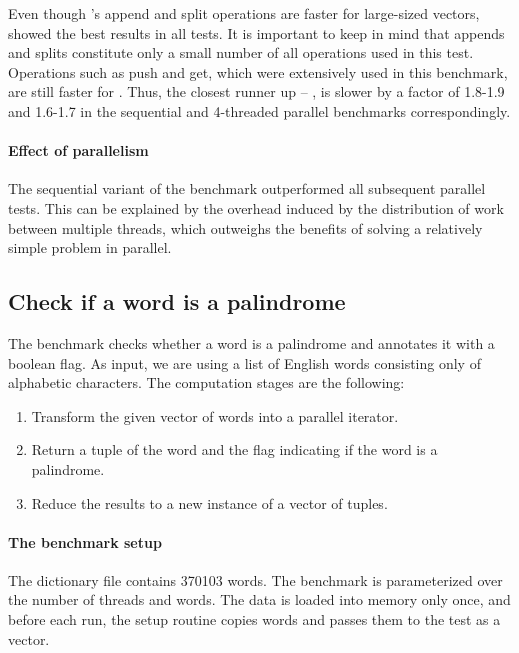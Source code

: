 Even though \rrbvec{}'s append and split operations are faster for large-sized vectors, \stdvec{} showed the best results in all tests. It is important to keep in mind that appends and splits constitute only a small number of all operations used in this test. Operations such as push and get, which were extensively used in this benchmark, are still faster for \stdvec{}. Thus, the closest runner up -- \pvec{}, is slower by a factor of 1.8-1.9 and 1.6-1.7 in the sequential and 4-threaded parallel benchmarks correspondingly.

\paragraph{Effect of parallelism}
The sequential variant of the benchmark outperformed all subsequent parallel tests. This can be explained by the overhead induced by the distribution of work between multiple threads, which outweighs the benefits of solving a relatively simple problem in parallel.

\subsection{Check if a word is a palindrome}
The benchmark checks whether a word is a palindrome and annotates it with a boolean flag. As input, we are using a list of English words consisting only of alphabetic characters. The computation stages are the following:

\begin{enumerate}
    \item Transform the given vector of words into a parallel iterator.
    \item Return a tuple of the word and the flag indicating if the word is a palindrome.
    \item Reduce the results to a new instance of a vector of tuples.
\end{enumerate}

\paragraph{The benchmark setup}
The dictionary file contains 370103 words. The benchmark is parameterized over the number of threads and words. The data is loaded into memory only once, and before each run, the setup routine copies \n{} words and passes them to the test as a vector.

